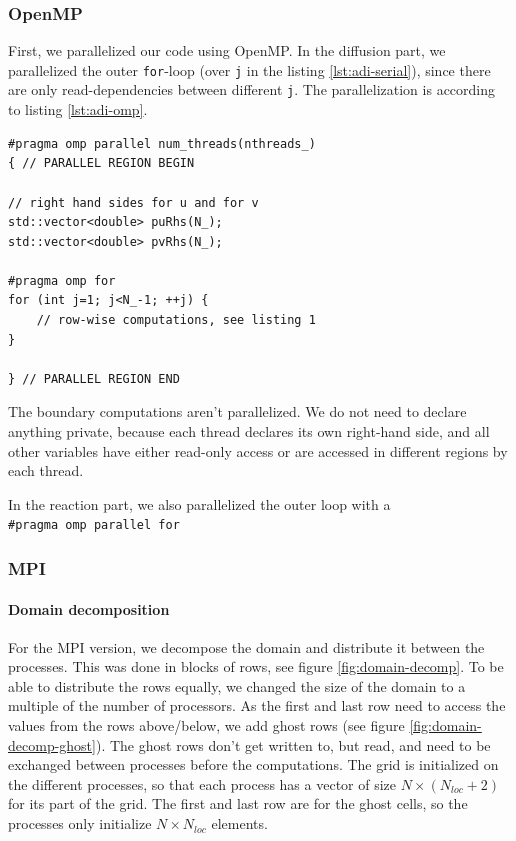 \documentclass[a4paper]{article}
\begin{document}
\subsubsection{OpenMP}
First, we parallelized our code using OpenMP.
In the diffusion part, we parallelized the outer \verb+for+-loop (over \verb+j+ in the listing \ref{lst:adi-serial}), since there are only read-dependencies between different \verb+j+.
The parallelization is according to listing \ref{lst:adi-omp}.

\begin{lstlisting}[label={lst:adi-omp}, caption={Parallel OpenMP region}, float]
#pragma omp parallel num_threads(nthreads_)
{ // PARALLEL REGION BEGIN

// right hand sides for u and for v
std::vector<double> puRhs(N_);
std::vector<double> pvRhs(N_);

#pragma omp for
for (int j=1; j<N_-1; ++j) {
    // row-wise computations, see listing 1
}

} // PARALLEL REGION END
\end{lstlisting}
The boundary computations aren't parallelized.
We do not need to declare anything private, because each thread declares its own right-hand side, and all other variables have either read-only access or are accessed in different regions by each thread.

In the reaction part, we also parallelized the outer loop with a \\
\verb+#pragma omp parallel for+

\subsubsection{MPI}
\paragraph{Domain decomposition}
For the MPI version, we decompose the domain and distribute it between the processes.
This was done in blocks of rows, see figure \ref{fig:domain-decomp}.
To be able to distribute the rows equally, we changed the size of the domain to a multiple of the number of processors.
As the first and last row need to access the values from the rows above/below, we add ghost rows (see figure \ref{fig:domain-decomp-ghost}).
The ghost rows don't get written to, but read, and need to be exchanged between processes before the computations.
The grid is initialized on the different processes, so that each process has a vector of size $N \times (N_{loc}+2)$ for its part of the grid.
The first and last row are for the ghost cells, so the processes only initialize $N \times N_{loc}$ elements.
\end{document}
